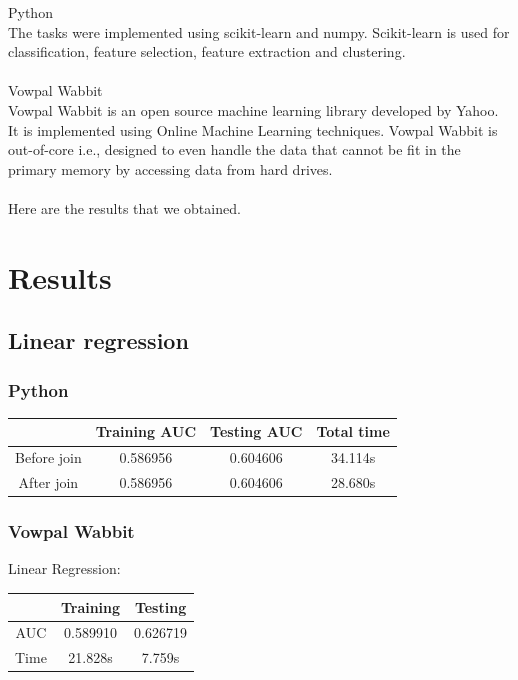 \documentclass[10pt]{article}
\begin{document}
Python\\
The tasks were implemented using scikit-learn and numpy. Scikit-learn is used for classification, feature selection, feature extraction and clustering.\\\\

Vowpal Wabbit\\
Vowpal Wabbit is an open source machine learning library developed by Yahoo. It is implemented using Online Machine Learning techniques. Vowpal Wabbit is out-of-core i.e., designed to even handle the data that cannot be fit in the primary memory by accessing data from hard drives.\\\\

Here are the results that we obtained.

\section{Results}
\subsection{Linear regression}
\subsubsection{Python}
\begin{center}
 \begin{tabular}{|c | c | c | c||} 
 \hline
 & Training AUC & Testing AUC & Total time\\ [0.5ex] 
 \hline\hline
Before join & 0.586956 & 0.604606 & 34.114s\\
 \hline
After join & 0.586956 & 0.604606 & 28.680s\\ 
 \hline
\end{tabular}
\end{center}

\subsubsection{Vowpal Wabbit}

Linear Regression:\\

\begin{center}
 \begin{tabular}{|c | c | c||} 
 \hline
 & Training & Testing\\ [0.5ex] 
 \hline\hline
AUC & 0.589910 & 0.626719\\ 
 \hline
Time & 21.828s & 7.759s\\ 
 \hline
\end{tabular}
\end{center}
\end{document}
